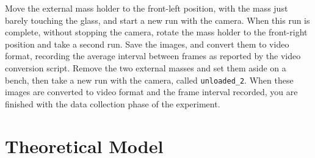 \documentclass{revtex4}
\begin{document}
Move the external mass holder to the front-left position, with the mass
just barely touching the glass, and start a new run with the camera.  When
this run is complete, without stopping the camera, rotate the mass holder
to the front-right position and take a second run.  Save the images, and
convert them to video format, recording the average interval between frames
as reported by the video conversion script.  Remove the two external masses
and set them aside on a bench, then take a new run with the camera, called
{\tt unloaded\_2}.  When these images are converted to video format and
the frame interval recorded, you are finished with the data collection
phase of the experiment.

\section{Theoretical Model}
\end{document}
